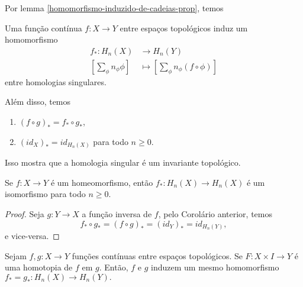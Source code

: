 Por lemma \ref{homomorfismo-induzido-de-cadeias-prop}, temos 

\begin{corol}
    Uma função contínua $f:X\rightarrow Y$ entre espaços topológicos induz um homomorfismo 
    \begin{align*}
        f_*: H_n(X)&\longrightarrow H_n(Y)\\
        [\sum_\phi n_\phi \phi]&\longmapsto [\sum_\phi n_\phi (f\circ \phi)]
    \end{align*} 
    entre homologias singulares.

    Além disso, temos 
    \begin{enumerate}
        \item $(f\circ g)_*=f_*\circ g_*$,
        \item $(id_X)_*=id_{H_n(X)}$ para todo $n\ge 0$.
    \end{enumerate}
\end{corol}
Isso mostra que a homologia singular é um invariante topológico.
\begin{corol}
    Se $f:X\rightarrow Y$ é um homeomorfismo, então $f_*:H_n(X)\rightarrow H_n(X)$ é um isomorfismo para todo $n\ge 0$. 
\end{corol}

\begin{proof}
    Seja $g:Y\rightarrow X$ a função inversa de $f$, pelo Corolário anterior, temos 
    \[f_*\circ g_*=(f\circ g)_*=(id_Y)_*=id_{H_n(Y)},\]
    e vice-versa.
\end{proof}

\begin{thm}
    Sejam $f,g:X\rightarrow Y$ funções contínuas entre espaços topológicos. Se $F:X\times I\rightarrow Y$ é uma homotopia de $f$ em $g$. Então, $f$ e $g$ induzem um mesmo homomorfismo $f_*=g_*:H_n(X)\rightarrow H_n(Y).$
\end{thm}

